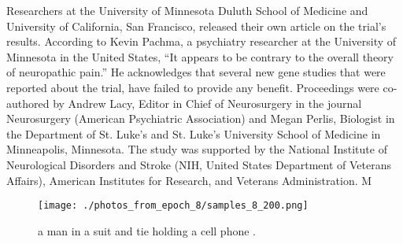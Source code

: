\documentclass{article}%
\begin{document}
Researchers at the University of Minnesota Duluth School of Medicine and University of California, San Francisco, released their own article on the trial’s results. According to Kevin Pachma, a psychiatry researcher at the University of Minnesota in the United States, “It appears to be contrary to the overall theory of neuropathic pain.” He acknowledges that several new gene studies that were reported about the trial, have failed to provide any benefit.\newline%
Proceedings were co{-}authored by Andrew Lacy, Editor in Chief of Neurosurgery in the journal Neurosurgery (American Psychiatric Association) and Megan Perlis, Biologist in the Department of St. Luke’s and St. Luke’s University School of Medicine in Minneapolis, Minnesota. The study was supported by the National Institute of Neurological Disorders and Stroke (NIH, United States Department of Veterans Affairs), American Institutes for Research, and Veterans Administration.\newline%
M\newline%

%


\begin{figure}[h!]%
\centering%
\texttt{[image: ./photos\_from\_epoch\_8/samples\_8\_200.png]}%
\caption{a man in a suit and tie holding a cell phone .}%
\end{figure}

%
\end{document}
